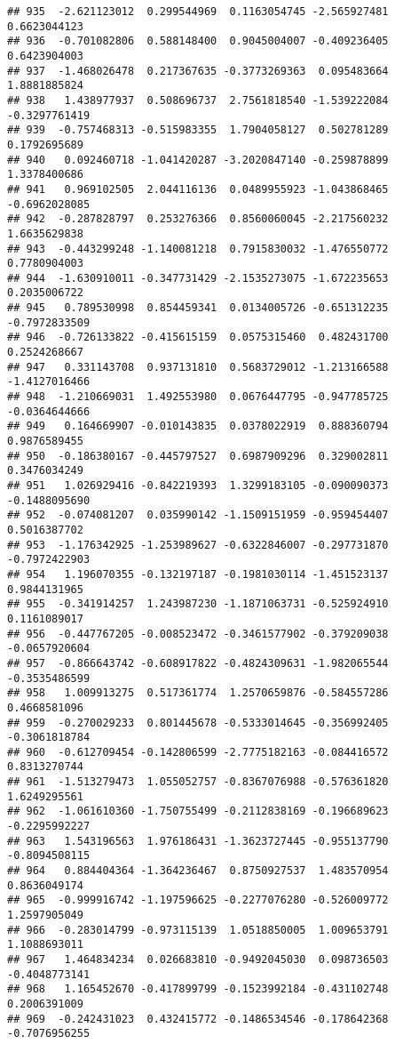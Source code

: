 \documentclass[
]{article}
\begin{document}
\begin{verbatim}
## 935  -2.621123012  0.299544969  0.1163054745 -2.565927481  0.6623044123
## 936  -0.701082806  0.588148400  0.9045004007 -0.409236405  0.6423904003
## 937  -1.468026478  0.217367635 -0.3773269363  0.095483664  1.8881885824
## 938   1.438977937  0.508696737  2.7561818540 -1.539222084 -0.3297761419
## 939  -0.757468313 -0.515983355  1.7904058127  0.502781289  0.1792695689
## 940   0.092460718 -1.041420287 -3.2020847140 -0.259878899  1.3378400686
## 941   0.969102505  2.044116136  0.0489955923 -1.043868465 -0.6962028085
## 942  -0.287828797  0.253276366  0.8560060045 -2.217560232  1.6635629838
## 943  -0.443299248 -1.140081218  0.7915830032 -1.476550772  0.7780904003
## 944  -1.630910011 -0.347731429 -2.1535273075 -1.672235653  0.2035006722
## 945   0.789530998  0.854459341  0.0134005726 -0.651312235 -0.7972833509
## 946  -0.726133822 -0.415615159  0.0575315460  0.482431700  0.2524268667
## 947   0.331143708  0.937131810  0.5683729012 -1.213166588 -1.4127016466
## 948  -1.210669031  1.492553980  0.0676447795 -0.947785725 -0.0364644666
## 949   0.164669907 -0.010143835  0.0378022919  0.888360794  0.9876589455
## 950  -0.186380167 -0.445797527  0.6987909296  0.329002811  0.3476034249
## 951   1.026929416 -0.842219393  1.3299183105 -0.090090373 -0.1488095690
## 952  -0.074081207  0.035990142 -1.1509151959 -0.959454407  0.5016387702
## 953  -1.176342925 -1.253989627 -0.6322846007 -0.297731870 -0.7972422903
## 954   1.196070355 -0.132197187 -0.1981030114 -1.451523137  0.9844131965
## 955  -0.341914257  1.243987230 -1.1871063731 -0.525924910  0.1161089017
## 956  -0.447767205 -0.008523472 -0.3461577902 -0.379209038 -0.0657920604
## 957  -0.866643742 -0.608917822 -0.4824309631 -1.982065544 -0.3535486599
## 958   1.009913275  0.517361774  1.2570659876 -0.584557286  0.4668581096
## 959  -0.270029233  0.801445678 -0.5333014645 -0.356992405 -0.3061818784
## 960  -0.612709454 -0.142806599 -2.7775182163 -0.084416572  0.8313270744
## 961  -1.513279473  1.055052757 -0.8367076988 -0.576361820  1.6249295561
## 962  -1.061610360 -1.750755499 -0.2112838169 -0.196689623 -0.2295992227
## 963   1.543196563  1.976186431 -1.3623727445 -0.955137790 -0.8094508115
## 964   0.884404364 -1.364236467  0.8750927537  1.483570954  0.8636049174
## 965  -0.999916742 -1.197596625 -0.2277076280 -0.526009772  1.2597905049
## 966  -0.283014799 -0.973115139  1.0518850005  1.009653791  1.1088693011
## 967   1.464834234  0.026683810 -0.9492045030  0.098736503 -0.4048773141
## 968   1.165452670 -0.417899799 -0.1523992184 -0.431102748  0.2006391009
## 969  -0.242431023  0.432415772 -0.1486534546 -0.178642368 -0.7076956255

\end{verbatim}
\end{document}
